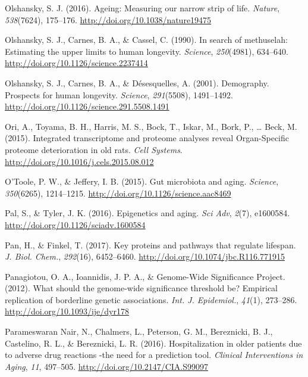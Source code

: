 \documentclass[12pt,twoside]{unicam}
\begin{document}
\begin{cslreferences}
\leavevmode\hypertarget{ref-Olshansky2016}{}%
Olshansky, S. J. (2016). Ageing: Measuring our narrow strip of life. \emph{Nature}, \emph{538}(7624), 175--176. \url{http://doi.org/10.1038/nature19475}

\leavevmode\hypertarget{ref-Olshansky1990}{}%
Olshansky, S. J., Carnes, B. A., \& Cassel, C. (1990). In search of methuselah: Estimating the upper limits to human longevity. \emph{Science}, \emph{250}(4981), 634--640. \url{http://doi.org/10.1126/science.2237414}

\leavevmode\hypertarget{ref-Olshansky2001}{}%
Olshansky, S. J., Carnes, B. A., \& Désesquelles, A. (2001). Demography. Prospects for human longevity. \emph{Science}, \emph{291}(5508), 1491--1492. \url{http://doi.org/10.1126/science.291.5508.1491}

\leavevmode\hypertarget{ref-Ori2015}{}%
Ori, A., Toyama, B. H., Harris, M. S., Bock, T., Iskar, M., Bork, P., \ldots{} Beck, M. (2015). Integrated transcriptome and proteome analyses reveal Organ-Specific proteome deterioration in old rats. \emph{Cell Systems}. \url{http://doi.org/10.1016/j.cels.2015.08.012}

\leavevmode\hypertarget{ref-OToole2015}{}%
O'Toole, P. W., \& Jeffery, I. B. (2015). Gut microbiota and aging. \emph{Science}, \emph{350}(6265), 1214--1215. \url{http://doi.org/10.1126/science.aac8469}

\leavevmode\hypertarget{ref-Pal2016}{}%
Pal, S., \& Tyler, J. K. (2016). Epigenetics and aging. \emph{Sci Adv}, \emph{2}(7), e1600584. \url{http://doi.org/10.1126/sciadv.1600584}

\leavevmode\hypertarget{ref-Pan2017}{}%
Pan, H., \& Finkel, T. (2017). Key proteins and pathways that regulate lifespan. \emph{J. Biol. Chem.}, \emph{292}(16), 6452--6460. \url{http://doi.org/10.1074/jbc.R116.771915}

\leavevmode\hypertarget{ref-Panagiotou2012}{}%
Panagiotou, O. A., Ioannidis, J. P. A., \& Genome-Wide Significance Project. (2012). What should the genome-wide significance threshold be? Empirical replication of borderline genetic associations. \emph{Int. J. Epidemiol.}, \emph{41}(1), 273--286. \url{http://doi.org/10.1093/ije/dyr178}

\leavevmode\hypertarget{ref-ParameswaranNair2016}{}%
Parameswaran Nair, N., Chalmers, L., Peterson, G. M., Bereznicki, B. J., Castelino, R. L., \& Bereznicki, L. R. (2016). Hospitalization in older patients due to adverse drug reactions -the need for a prediction tool. \emph{Clinical Interventions in Aging}, \emph{11}, 497--505. \url{http://doi.org/10.2147/CIA.S99097}


\end{cslreferences}
\end{document}
